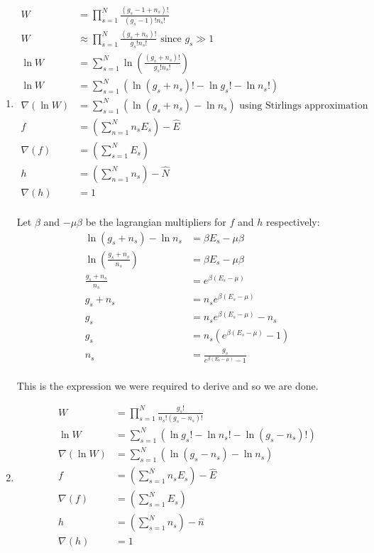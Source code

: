 \documentclass[10pt,\jkfside,a4paper]{article}
\begin{document}
\begin{enumerate}
\begin{enumerate}
\item 
\begin{equation}
\begin{split}
W &= \prod^N_{s=1}\frac{(g_s - 1 + n_s)!}{(g_s - 1)!n_s!} \\
W &\approx \prod^N_{s=1}\frac{(g_s + n_s)!}{g_s!n_s!} \text{ since } g_s \gg 1 \\
\ln W &= \sum^N_{s=1}\ln\left(\frac{(g_s + n_s)!}{g_s!n_s!}\right) \\
\ln W &= \sum^N_{s=1}\left(\ln(g_s + n_s)! - \ln g_s! - \ln n_s!\right) \\
\nabla(\ln W) &= \sum^N_{s=1}\left(\ln(g_s + n_s) - \ln n_s\right) \text{ using Stirlings approximation}\\
f &= \left(\sum^N_{n = 1} n_sE_s\right) - \hat{E} \\
\nabla(f) &= \left(\sum^N_{s=1} E_s\right) \\
h &= \left(\sum^N_{n=1} n_s\right) - \hat{N} \\
\nabla(h) &= 1 \\
\end{split}
\end{equation}

Let $\beta$ and $-\mu\beta$ be the lagrangian multipliers for $f$ and $h$ respectively:
\begin{equation}
\begin{split}
\ln(g_s + n_s) - \ln n_s &= \beta E_s - \mu\beta \\
\ln \left(\frac{g_s + n_s}{n_s}\right) &= \beta E_s - \mu\beta \\
\frac{g_s + n_s}{n_s} &= e^{\beta(E_s - \mu)} \\
g_s + n_s &= n_se^{\beta(E_s - \mu)} \\
g_s &= n_se^{\beta(E_s - \mu)} - n_s \\
g_s &= n_s(e^{\beta(E_s - \mu)} - 1) \\
n_s &= \frac{g_s}{e^{\beta(E_s - \mu)} - 1} \\
\end{split}
\end{equation}

This is the expression we were required to derive and so we are done.

\item
\begin{equation}
\begin{split}
W &= \prod^N_{s=1}\frac{g_s!}{n_s!(g_s - n_s)!} \\
\ln W &= \sum^N_{s=1}\left(\ln g_s ! - \ln n_s ! - \ln (g_s - n_s)!\right) \\
\nabla(\ln W) &= \sum^N_{s=1}\left(\ln (g_s - n_s) - \ln n_s\right) \\
f &= \left(\sum^N_{s=1} n_sE_s\right) - \hat{E} \\
\nabla(f) &= \left(\sum^N_{s=1} E_s\right) \\
h &= \left(\sum^N_{s=1} n_s\right) - \hat{n} \\
\nabla(h) &= 1 \\
\end{split}
\end{equation}


\end{enumerate}
\end{enumerate}
\end{document}
